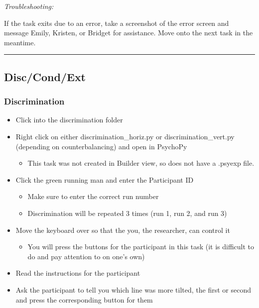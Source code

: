 \documentclass[]{book}
\providecommand{\tightlist}{%
  \setlength{\itemsep}{0pt}\setlength{\parskip}{0pt}}
\begin{document}
\emph{Troubleshooting:}

If the task exits due to an error, take a screenshot of the error screen and message Emily, Kristen, or Bridget for assistance. Move onto the next task in the meantime.

\begin{center}\rule{0.5\linewidth}{0.5pt}\end{center}

\hypertarget{disccondext}{%
\subsection{Disc/Cond/Ext}\label{disccondext}}

\hypertarget{discrimination}{%
\subsubsection{Discrimination}\label{discrimination}}

\begin{itemize}
\tightlist
\item
  Click into the discrimination folder
\item
  Right click on either discrimination\_horiz.py or discrimination\_vert.py (depending on counterbalancing) and open in PsychoPy

  \begin{itemize}
  \tightlist
  \item
    This task was not created in Builder view, so does not have a .psyexp file.
  \end{itemize}
\item
  Click the green running man and enter the Participant ID

  \begin{itemize}
  \tightlist
  \item
    Make sure to enter the correct run number
  \item
    Discrimination will be repeated 3 times (run 1, run 2, and run 3)
  \end{itemize}
\item
  Move the keyboard over so that the you, the researcher, can control it

  \begin{itemize}
  \tightlist
  \item
    You will press the buttons for the participant in this task (it is difficult to do and pay attention to on one's own)
  \end{itemize}
\item
  Read the instructions for the participant
\item
  Ask the participant to tell you which line was more tilted, the first or second and press the corresponding button for them
\end{itemize}
\end{document}
